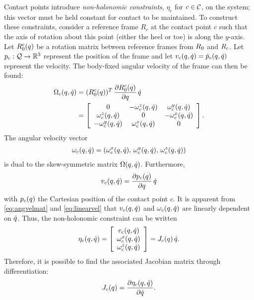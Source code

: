Contact points introduce {\em non-holonomic constraints}, $\eta_{c}$ for $c \in
\mathcal{C}$, on the system; this vector must be held constant for contact to be
maintained.
%
To construct these constraints, consider a reference frame $R_{c}$ at the
contact point $c$ such that the axis of rotation about this point (either the
heel or toe) is along the $y$-axis.
%
Let $R_{0}^{c}(q)$ be a rotation matrix between reference frames from
$R_{0}$ and $R_{c}$.
%
Let $p_{c} : \mathcal{Q} \to \mathbb{R}^{3}$ represent the position of the frame and let
$v_{c}(q, \dot{q}) = {\dot {p}}_{c}(q, \dot{q})$ represent the velocity.
%
The body-fixed angular velocity of the frame can then be found:
%
\begin{align}
  \label{eq:angvelmat}
  \Omega_{c}(q, \dot{q}) &= (R_{0}^{c}(q))^{T} \, \frac{\partial{R_{0}^{c}(q)}}{\partial{q}}
  \, \dot{q}\\
  \nonumber
  &= \left[\begin{array}{c c c}
      0 & -\omega_{c}^{z}(q, \dot{q}) & \omega_{c}^{y}(q, \dot{q})\\
      \omega_{c}^{z}(q, \dot{q}) & 0 & -\omega_{c}^{x}(q, \dot{q})\\
      -\omega_{c}^{y}(q, \dot{q}) & \omega_{c}^{x}(q, \dot{q}) & 0
    \end{array}\right].
\end{align}
%
The angular velocity vector
\begin{align*}
  \omega_{c}(q, \dot{q}) = (\omega_{c}^{x}(q, \dot{q}), \, \omega_{c}^{y}(q, \dot{q}), \, \omega_{c}^{z}(q, \dot{q}))
\end{align*}
is dual to the skew-symmetric matrix $\Omega(q, \dot{q})$.
%
Furthermore,
\begin{align}
  \label{eq:linearvel}
  v_{c}(q, \dot{q}) = \frac{\partial{p_{c}(q)}}{\partial{q}} \, \dot{q}
\end{align}
with $p_{c}(q)$ the Cartesian position of the contact point $c$.
%
It is apparent from \eqref{eq:angvelmat} and \eqref{eq:linearvel} that
$v_{c}(q, \dot{q})$ and $\omega_{c}(q, \dot{q})$ are linearly dependent on $\dot{q}$.
%
Thus, the non-holonomic constraint can be written
\begin{align*}
  \eta_{c}(q, \dot{q}) = \left[\begin{array}{c}
      v_{c}(q, \dot{q})\\
      \omega_{c}^{x}(q, \dot{q})\\
      \omega_{c}^{z}(q, \dot{q})
    \end{array}\right] =
  J_{c}(q) \, \dot{q}.
\end{align*}
%
Therefore, it is possible to find the associated Jacobian matrix through
differentiation:
%
\begin{align*}
  J_{c}(q) = \frac{\partial{\eta_{c}(q, \dot{q})}}{\partial{\dot{q}}}.
\end{align*}
